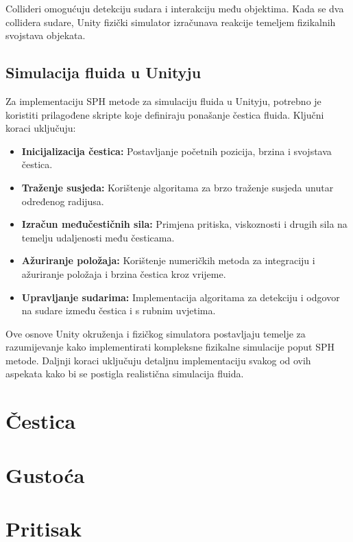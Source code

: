 \documentclass[diplomskirad]{fer}
\begin{document}
    Collideri omogućuju detekciju sudara i interakciju među objektima.
    Kada se dva collidera sudare, Unity fizički simulator izračunava reakcije temeljem fizikalnih svojstava objekata.

    \subsection{Simulacija fluida u Unityju}\label{subsec:simulacija-fluida-u-unityju}
    Za implementaciju SPH metode za simulaciju fluida u Unityju, potrebno je koristiti prilagođene skripte koje definiraju ponašanje čestica fluida.
    Ključni koraci uključuju:
    \begin{itemize}
        \item \textbf{Inicijalizacija čestica:} Postavljanje početnih pozicija, brzina i svojstava čestica.
        \item \textbf{Traženje susjeda:} Korištenje algoritama za brzo traženje susjeda unutar određenog radijusa.
        \item \textbf{Izračun međučestičnih sila:} Primjena pritiska, viskoznosti i drugih sila na temelju udaljenosti među česticama.
        \item \textbf{Ažuriranje položaja:} Korištenje numeričkih metoda za integraciju i ažuriranje položaja i brzina čestica kroz vrijeme.
        \item \textbf{Upravljanje sudarima:} Implementacija algoritama za detekciju i odgovor na sudare između čestica i s rubnim uvjetima.
    \end{itemize}

    Ove osnove Unity okruženja i fizičkog simulatora postavljaju temelje za razumijevanje kako implementirati kompleksne fizikalne simulacije poput SPH metode. Daljnji koraci uključuju detaljnu implementaciju svakog od ovih aspekata kako bi se postigla realistična simulacija fluida.

    \section{Čestica}\label{sec:cestica}


    \section{Gustoća}\label{sec:gustoca}


    \section{Pritisak}\label{sec:pritisak}
\end{document}
